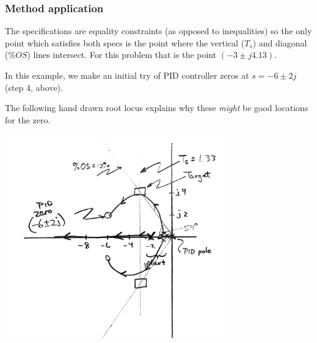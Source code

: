 \begin{ExampleCont}

\subsubsection*{Method application}
The specifications are equality constraints (as opposed to inequalities) so the only point which satisfies both specs is the point where the vertical ($T_s$) and diagonal ($\%OS$) lines intersect.  For this problem that is the point $(-3 \pm j4.13)$.

In this example, we make an initial try of PID controller zeros at $s=-6\pm2j$ (step 4, above).

The following hand drawn root locus explains why these {\it might} be good locations for the
 zero.

\includegraphics[width=95mm]{figs09/00823a.png}

\end{ExampleCont}

